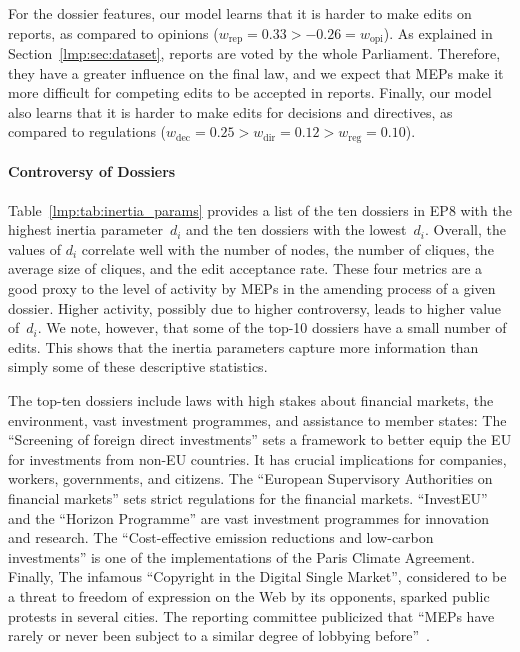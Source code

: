 For the dossier features, our model learns that it is harder to make edits on reports, as compared to opinions ($w_{\text{rep}}=0.33 > -0.26 = w_{\text{opi}}$).
As explained in Section~\ref{lmp:sec:dataset}, reports are voted by the whole Parliament.
Therefore, they have a greater influence on the final law, and we expect that MEPs make it more difficult for competing edits to be accepted in reports.
Finally, our model also learns that it is harder to make edits for decisions and directives, as compared to regulations ($w_{\text{dec}}=0.25 > w_{\text{dir}} = 0.12 > w_{\text{reg}} =0.10$).

\paragraph{Controversy of Dossiers}

Table~\ref{lmp:tab:inertia_params} provides a list of the ten dossiers in EP8 with the highest inertia parameter~$d_i$ and the ten dossiers with the lowest~$ d_i $.
Overall, the values of $d_i$ correlate well with the number of nodes, the number of cliques, the average size of cliques, and the edit acceptance rate.
These four metrics are a good proxy to the level of activity by MEPs in the amending process of a given dossier.
Higher activity, possibly due to higher controversy, leads to higher value of~$d_i$.
We note, however, that some of the top-10 dossiers have a small number of edits.
This shows that the inertia parameters capture more information than simply some of these descriptive statistics.

The top-ten dossiers include laws with high stakes about financial markets, the environment, vast investment programmes, and assistance to member states:
The ``Screening of foreign direct investments'' sets a framework to better equip the EU for investments from non-EU countries.
It has crucial implications for companies, workers, governments, and citizens.
The ``European Supervisory Authorities on financial markets'' sets strict regulations for the financial markets.
``InvestEU'' and the ``Horizon Programme'' are vast investment programmes for innovation and research.
The ``Cost-effective emission reductions and low-carbon investments'' is one of the implementations of the Paris Climate Agreement.
Finally, The infamous ``Copyright in the Digital Single Market'', considered to be a threat to freedom of expression on the Web by its opponents, sparked public protests in several cities.
The reporting committee publicized that ``MEPs have rarely or never been subject to a similar degree of lobbying before''~\citep{europarl2019questions}.

